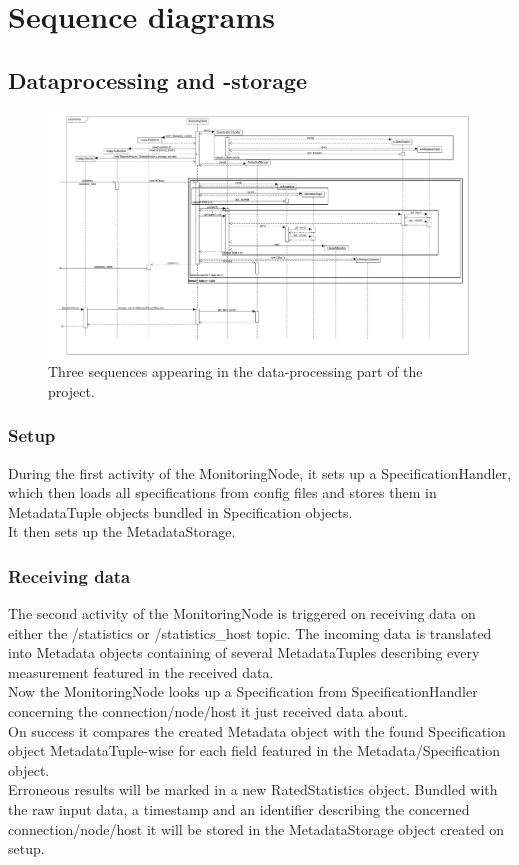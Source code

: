 \chapter{Sequence diagrams}

\section{Dataprocessing and -storage}
\begin{figure}[!ht]
	\begin{center}
		\includegraphics[width=1.0\linewidth]{./diagram_pictures/processing_seq.pdf}
		\caption{Three sequences appearing in the data-processing part of the project.}
	\end{center}
\end{figure}

\subsection*{Setup}
During the first activity of the MonitoringNode, it sets up a SpecificationHandler, which then loads all specifications from config files and stores them in MetadataTuple objects bundled in Specification objects.\\
It then sets up the MetadataStorage.

\subsection*{Receiving data}
The second activity of the MonitoringNode is triggered on receiving data on either the /statistics or /statistics\_host topic. The incoming data is translated into Metadata objects containing of several MetadataTuples describing every measurement featured in the received data.\\
Now the MonitoringNode looks up a Specification from SpecificationHandler concerning the connection/node/host it just received data about.\\
On success it compares the created Metadata object with the found Specification object MetadataTuple-wise for each field featured in the Metadata/Specification object.\\
Erroneous results will be marked in a new RatedStatistics object. Bundled with the raw input data, a timestamp and an identifier describing the concerned connection/node/host it will be stored in the MetadataStorage object created on setup.

